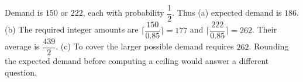 Demand is $150$ or $222$, each with probability $\dfrac{1}{2}$. Thus (a) expected demand is $\boxed{186}$. (b) The required integer amounts are $\lceil\dfrac{150}{0.85}\rceil=177$ and $\lceil\dfrac{222}{0.85}\rceil=262$. Their average is $\boxed{\dfrac{439}{2}}$. (c) To cover the larger possible demand requires $\boxed{262}$. Rounding the expected demand before computing a ceiling would answer a different question.
